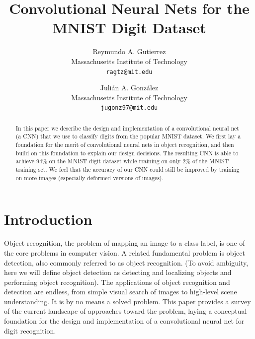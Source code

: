 \documentclass[10pt,twocolumn,letterpaper]{article}
\begin{document}
\title{Convolutional Neural Nets for the MNIST Digit Dataset}

\author{Reymundo A. Gutierrez\\
Massachusetts Institute of Technology\\
{\tt\small ragtz@mit.edu}\\
\and
Juli\'{a}n A. Gonz\'{a}lez\\
Massachusetts Institute of Technology\\
{\tt\small jugonz97@mit.edu}
}

\maketitle

\begin{abstract}
   In this paper we describe the design and implementation of a convolutional neural net (a CNN)
   that we use to classify digits from the popular MNIST dataset. We first lay a foundation
   for the merit of convolutional neural nets in object recognition, and then build on this
   foundation to explain our design decisions. The resulting CNN is able to achieve 94\% on the
   MNIST digit dataset while training on only 2\% of the MNIST training set. We feel that the accuracy
   of our CNN could still be improved by training on more images (especially deformed versions of images).
\end{abstract}

\section{Introduction}

Object recognition, the problem of mapping an image to a class label, is one of the core
problems in computer vision.
A related fundamental problem is object detection, also commonly referred to as object recognition.
(To avoid ambiguity, here we will define object detection as detecting and localizing objects and
performing object recognition).
The applications of object recognition and detection are endless, from simple visual search of
images to high-level scene understanding. It is by no means a solved problem.
This paper provides a survey of the current landscape of approaches toward the problem,
laying a conceptual foundation for the design and implementation of a convolutional neural net for
digit recognition.
\end{document}
